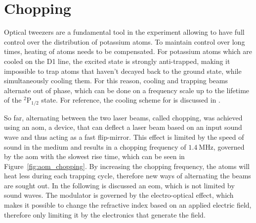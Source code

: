 \chapter{Chopping}



Optical tweezers are a fundamental tool in the experiment allowing to have full control over the distribution of potassium atoms. To maintain control over long times, heating of atoms needs to be compensated. For potassium atoms which are cooled on the D1 line, the excited state is strongly anti-trapped, making it impossible to trap atoms that haven't decayed back to the ground state, while simultaneously cooling them. For this reason, cooling and trapping beams alternate out of phase, which can be done on a frequency scale up to the lifetime of the $^2$P$_{1/2}$ state. For reference, the cooling scheme for  is discussed in \cite{Duda2017}.

So far, alternating between the two laser beams, called chopping, was achieved using an \ac{aom}, a device, that can deflect a laser beam based on an input sound wave and thus acting as a fast flip-mirror. This effect is limited by the speed of sound in the medium and results in a chopping frequency of $\SI{1.4}{\mega\hertz}$, governed by the \ac{aom} with the slowest rise time, which can be seen in Figure~\ref{fig:aom_chopping}. By increasing the chopping frequency, the atoms will heat less during each trapping cycle, therefore new ways of alternating the beams are sought out. In the following is discussed an \ac{eom}, which is not limited by sound waves. The modulator is governed by the electro-optical effect, which makes it possible to change the refractive index based on an applied electric field, therefore only limiting it by the electronics that generate the field.

